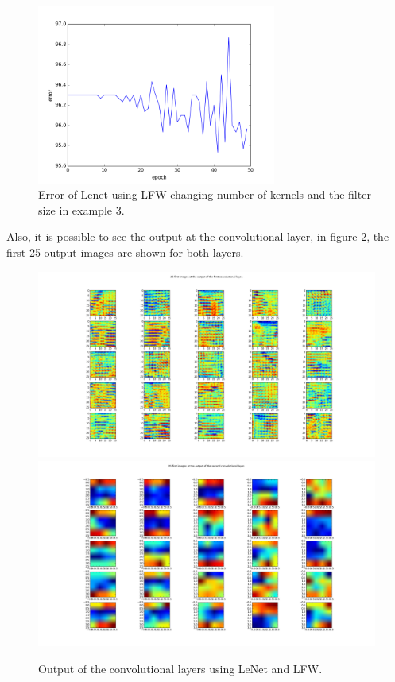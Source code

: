\begin{figure}[htb]
\centering
\includegraphics[width=0.7\textwidth]{images/LFW_layers/error_conv_40_60_3.png}
\caption{Error of Lenet using LFW changing number of kernels and the filter size in example 3.} \label{fig:LENETLFW_ker3}
\end{figure}

Also, it is possible to see the output at the convolutional layer, in figure \ref{fig:LENETLFW_ker4}, the first 25 output images are shown for both layers.\\

\begin{figure}[htb]
\centering
\includegraphics[width=1.4\textwidth]{images/LFW_layers/conv_0_out.png}
\includegraphics[width=1.4\textwidth]{images/LFW_layers/conv_1_out.png}
\caption{Output of the convolutional layers using LeNet and LFW.} \label{fig:LENETLFW_ker4}
\end{figure}

